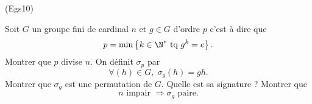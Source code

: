 \begin{tiny}(Egs10)\end{tiny} Soit $G$ un groupe fini de cardinal $n$ et $g\in G$ d'ordre $p$ c'est à dire que
\[
 p = \min\left\lbrace k \in \N^* \text{ tq } g^k = e\right\rbrace. 
\]
Montrer que $p$ divise $n$. On définit $\sigma_p$ par
\[
 \forall(h)\in G, \; \sigma_g(h) = gh.
\]
Montrer que $\sigma_g$ est une permutation de $G$. Quelle est sa signature ? Montrer que 
\[
 n\text{ impair } \Rightarrow \sigma_g \text{ paire}.
\]
